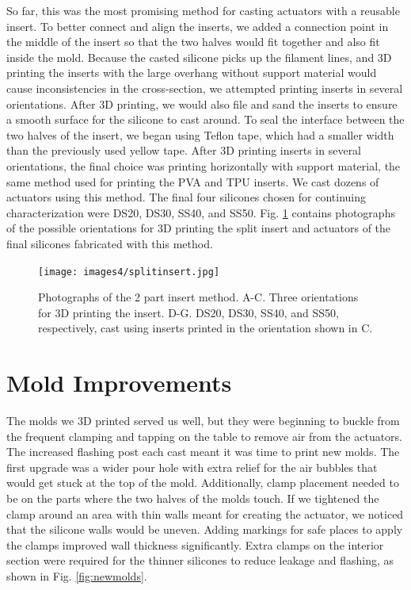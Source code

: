 So far, this was the most promising method for casting actuators with a reusable insert. To better connect and align the inserts, we added a connection point in the middle of the insert so that the two halves would fit together and also fit inside the mold. Because the casted silicone picks up the filament lines, and 3D printing the inserts with the large overhang without support material would cause inconsistencies in the cross-section, we attempted printing inserts in several orientations. After 3D printing, we would also file and sand the inserts to ensure a smooth surface for the silicone to cast around. To seal the interface between the two halves of the insert, we began using Teflon tape, which had a smaller width than the previously used yellow tape. After 3D printing inserts in several orientations, the final choice was printing horizontally with support material, the same method used for printing the PVA and TPU inserts. We cast dozens of actuators using this method. The final four silicones chosen for continuing characterization were DS20, DS30, SS40, and SS50. Fig. \ref{fig:splitinsert} contains photographs of the possible orientations for 3D printing the split insert and actuators of the final silicones fabricated with this method. 

\begin{figure}[ht!]
    \centering
    \texttt{[image: images4/splitinsert.jpg]}
    \caption{Photographs of the 2 part insert method. A-C. Three orientations for 3D printing the insert. D-G. DS20, DS30, SS40, and SS50, respectively, cast using inserts printed in the orientation shown in C.}
    \label{fig:splitinsert}
\end{figure}

\clearpage
\section{Mold Improvements}
The molds we 3D printed served us well, but they were beginning to buckle from the frequent clamping and tapping on the table to remove air from the actuators. The increased flashing post each cast meant it was time to print new molds. The first upgrade was a wider pour hole with extra relief for the air bubbles that would get stuck at the top of the mold. Additionally, clamp placement needed to be on the parts where the two halves of the molds touch. If we tightened the clamp around an area with thin walls meant for creating the actuator, we noticed that the silicone walls would be uneven. Adding markings for safe places to apply the clamps improved wall thickness significantly. Extra clamps on the interior section were required for the thinner silicones to reduce leakage and flashing, as shown in Fig. \ref{fig:newmolds}.

